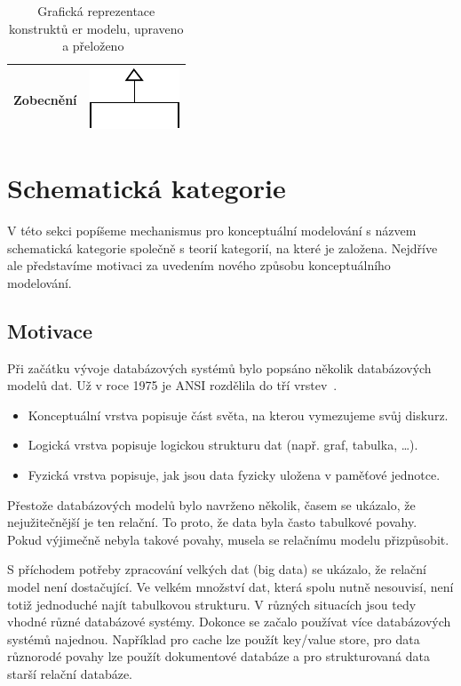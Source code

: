 \begin{table}[!htb]
\begin{tabular}{@{}rm{9cm}@{}}
    Zobecnění             & \includegraphics{../img/er-model/generalization.pdf}      \\ \bottomrule
  \end{tabular}
  \caption[Grafická reprezentace konstruktů \acrshort{er} modelu]{Grafická reprezentace konstruktů \acrshort{er} modelu, upraveno a přeloženo~\cite[s.~164, Obr.~5.4]{atzeni_database_1999}}
  \label{tab:er-constructs}
\end{table}

\section{Schematická kategorie}\label{section:schemcat}

V této sekci popíšeme mechanismus pro konceptuální modelování s názvem schematická kategorie společně s teorií kategorií, na které je založena.
Nejdříve ale představíme motivaci za uvedením nového způsobu konceptuálního modelování.

\subsection{Motivace}

Při začátku vývoje databázových systémů bylo popsáno několik databázových modelů dat.
Už v roce 1975 je ANSI rozdělila do tří vrstev~\cite{steeljr._interimreport_1975}.
\begin{itemize}
  \item Konceptuální vrstva popisuje část světa, na kterou vymezujeme svůj diskurz.
  \item Logická vrstva popisuje logickou strukturu dat (např. graf, tabulka, \dots).
  \item Fyzická vrstva popisuje, jak jsou data fyzicky uložena v paměťové jednotce.
\end{itemize}

Přestože databázových modelů bylo navrženo několik, časem se ukázalo, že nejužitečnější je ten relační.
To proto, že data byla často tabulkové povahy.
Pokud výjimečně nebyla takové povahy, musela se relačnímu modelu přizpůsobit.

S příchodem potřeby zpracování velkých dat (big data) se ukázalo, že relační model není dostačující.
Ve velkém množství dat, která spolu nutně nesouvisí, není totiž jednoduché najít tabulkovou strukturu.
V různých situacích jsou tedy vhodné různé databázové systémy.
Dokonce se začalo používat více databázových systémů najednou.
Například pro cache lze použít key/value store, pro data různorodé povahy lze použít dokumentové databáze a pro strukturovaná data starší relační databáze.

